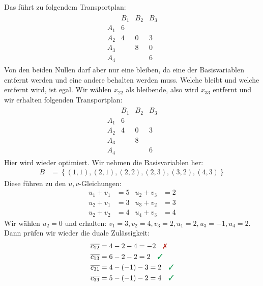 \documentclass[
a4paper, %
11pt,
]
{scrartcl}
\begin{document}
\begin{enumerate}[(a)]
    Das führt zu folgendem Transportplan:
    \begin{align*}
      \begin{matrix}
            & B_1 & B_2 & B_3\\
        A_1 & 6\\
        A_2 & 4   & 0   & 3\\
        A_3 &     & 8   & 0\\
        A_4 &     &     & 6
      \end{matrix}
    \end{align*}
    Von den beiden Nullen darf aber nur eine bleiben, da eine der Basisvariablen
    entfernt werden und eine andere behalten werden muss. Welche bleibt und
    welche entfernt wird, ist egal. Wir wählen $x_{22}$ als bleibende, also wird
    $x_{33}$ entfernt und wir erhalten folgenden Transportplan:
    \begin{align*}
      \begin{matrix}
            & B_1 & B_2 & B_3\\
        A_1 & 6\\
        A_2 & 4   & 0   & 3\\
        A_3 &     & 8\\
        A_4 &     &     & 6
      \end{matrix}
    \end{align*}
    Hier wird wieder optimiert. Wir nehmen die Basisvariablen her:
    \begin{align*}
      B & = \left\{ (1,1), (2,1), (2,2), (2,3), (3,2), (4,3) \right\}
    \end{align*}
    Diese führen zu den $u,v$-Gleichungen:
    \begin{align*}
      u_1 + v_1 & = 5 & u_2 + v_3 & = 2\\
      u_2 + v_1 & = 3 & u_3 + v_2 & = 3\\
      u_2 + v_2 & = 4 & u_4 + v_3 & = 4
    \end{align*}
    Wir wählen $u_2 = 0$ und erhalten: $v_1 = 3, v_2 = 4, v_3 = 2, u_1 = 2, u_3
    = -1, u_4 = 2$. Dann prüfen wir wieder die duale Zulässigkeit:
    \begin{align*}
      \overline{c_{12}} & = 4 - 2 - 4    = -2 \quad \falsch\\
      \overline{c_{13}} & = 6 - 2 - 2    = 2 \quad \richtig\\
      \overline{c_{31}} & = 4 - (-1) - 3 = 2 \quad \richtig\\
      \overline{c_{33}} & = 5 - (-1) - 2 = 4 \quad \richtig\\

\end{align*}
\end{enumerate}
\end{document}
